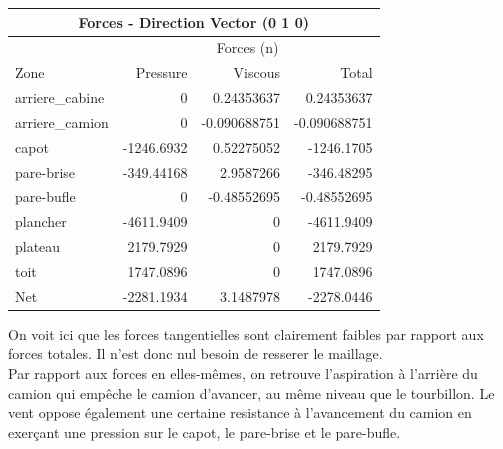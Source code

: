 \begin{center}\begin{tabular}{|l|r r r|}
\hline
\multicolumn{4}{|c|}{Forces - Direction Vector (0 1 0)} \\
\hline
		&   \multicolumn{3}{c|}{Forces (n)} \\
\hline
Zone                &     Pressure    &   Viscous     &   Total      \\
\hline
arriere\_cabine      &     0           &   0.24353637  &   0.24353637  \\ 
arriere\_camion      &     0           &   -0.090688751&   -0.090688751\\ 
capot               &     -1246.6932  &   0.52275052  &   -1246.1705  \\ 
pare-brise          &     -349.44168  &   2.9587266   &   -346.48295  \\ 
pare-bufle          &     0           &   -0.48552695 &   -0.48552695 \\ 
plancher            &     -4611.9409  &   0           &   -4611.9409  \\ 
plateau             &     2179.7929   &   0           &   2179.7929   \\ 
toit                &     1747.0896   &   0           &   1747.0896   \\ 
\hline
\hline
Net                 &     -2281.1934  &   3.1487978   &   -2278.0446  \\ 
\hline
\end{tabular}\end{center}

On voit ici que les forces tangentielles sont clairement faibles par rapport aux forces totales. Il n'est donc nul besoin de resserer le maillage.\\
Par rapport aux forces en elles-mêmes, on retrouve l'aspiration à l'arrière du camion qui empêche le camion d'avancer, au même niveau que le tourbillon. Le vent oppose également une certaine resistance à l'avancement du camion en exerçant une pression sur le capot, le pare-brise et le pare-bufle. 

